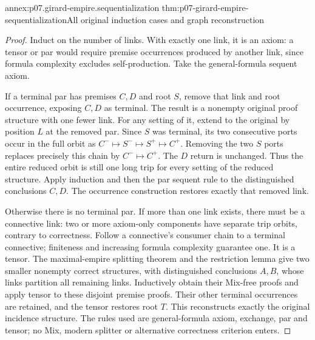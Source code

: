 \begin{annexitem}{annex:p07.girard-empire.sequentialization}
 {thm:p07-girard-empire-sequentialization}{All original induction cases and graph reconstruction}
\begin{proof}
Induct on the number of links.
With exactly one link, it is an axiom: a tensor or par would require
premise occurrences produced by another link, since formula complexity
excludes self-production. Take the general-formula sequent axiom.

If a terminal par has premises \(C,D\) and root \(S\), remove that
link and root occurrence, exposing \(C,D\) as terminal.
The result is a nonempty original proof structure with one fewer link.
For any setting of it, extend to the original by position \(L\) at
the removed par. Since \(S\) was terminal, its two consecutive ports
occur in the full orbit as
\(C^-\mapsto S^-\mapsto S^+\mapsto C^+\).
Removing the two \(S\) ports replaces precisely this chain by
\(C^-\mapsto C^+\). The \(D\) return is unchanged.
Thus the entire reduced orbit is still one long trip for every
setting of the reduced structure. Apply induction and then the par
sequent rule to the distinguished conclusions \(C,D\).
The occurrence construction restores exactly that removed link.

Otherwise there is no terminal par. If more than one link exists,
there must be a connective link: two or more axiom-only components
have separate trip orbits, contrary to correctness.
Follow a connective's consumer chain to a terminal connective;
finiteness and increasing formula complexity guarantee one.
It is a tensor. The maximal-empire splitting theorem and the
restriction lemma give two smaller nonempty correct structures,
with distinguished conclusions \(A,B\), whose links partition all
remaining links. Inductively obtain their Mix-free proofs and apply
tensor to these disjoint premise proofs. Their other terminal
occurrences are retained, and the tensor restores root \(T\).
This reconstructs exactly the original incidence structure.
The rules used are general-formula axiom, exchange, par and tensor;
no Mix, modern splitter or alternative correctness criterion enters.
\end{proof}
\end{annexitem}

